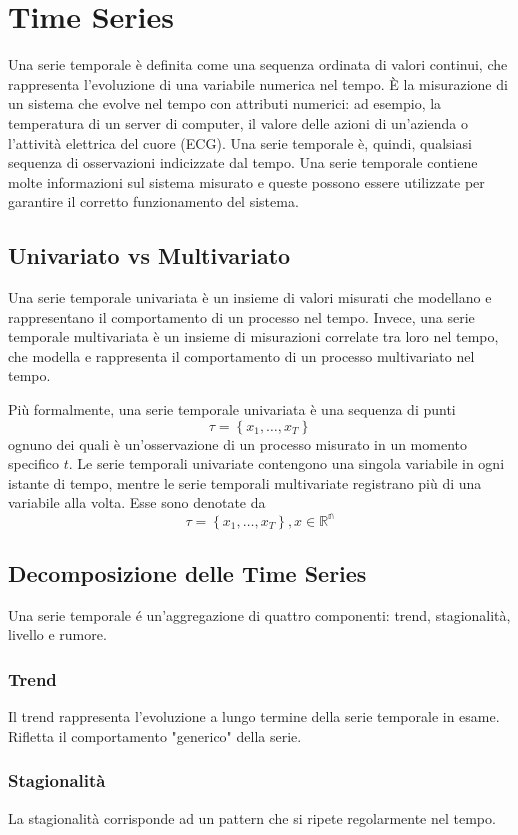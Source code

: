 \section{Time Series}
Una serie temporale è definita come una sequenza ordinata di valori continui, che rappresenta l'evoluzione di una variabile numerica nel tempo. È la misurazione di un sistema che evolve nel tempo con attributi numerici: ad esempio, la temperatura di un server di computer, il valore delle azioni di un'azienda o l'attività elettrica del cuore (ECG). Una serie temporale è, quindi, qualsiasi sequenza di osservazioni indicizzate dal tempo. Una serie temporale contiene molte informazioni sul sistema misurato e queste possono essere utilizzate per garantire il corretto funzionamento del sistema.

\subsection{Univariato vs Multivariato}
Una serie temporale univariata è un insieme di valori misurati che modellano e rappresentano il comportamento di un processo nel tempo. Invece, una serie temporale multivariata è un insieme di misurazioni correlate tra loro nel tempo, che modella e rappresenta il comportamento di un processo multivariato nel tempo. 

Più formalmente, una serie temporale univariata è una sequenza di punti
\[\tau = \left\{ x_1, \ldots, x_T  \right\}\]
ognuno dei quali è un'osservazione di un processo misurato in un momento specifico $t$. Le serie temporali univariate contengono una singola variabile in ogni istante di tempo, mentre le serie temporali multivariate registrano più di una variabile alla volta. Esse sono denotate da
\[\tau = \left\{ x_1, \ldots, x_T  \right\}, x \in \mathbb{R^n} \]

\subsection{Decomposizione delle Time Series}
Una serie temporale é un'aggregazione di quattro componenti: trend, stagionalità, livello e rumore.

\subsubsection{Trend}
Il trend rappresenta l'evoluzione a lungo termine della serie temporale in esame. Rifletta il comportamento "generico" della serie.

\subsubsection{Stagionalità}
La stagionalità corrisponde ad un pattern che si ripete regolarmente nel tempo.

